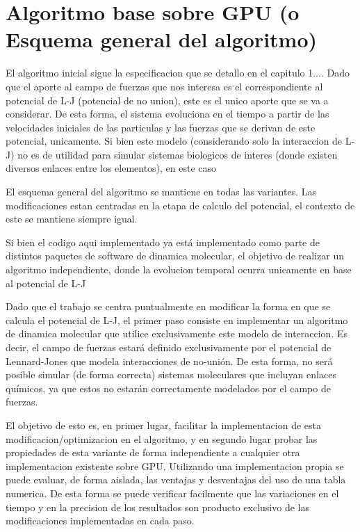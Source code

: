 \documentclass[a4paper,10pt]{report}
\begin{document}
\section{Algoritmo base sobre GPU (o Esquema general del algoritmo)}




El algoritmo inicial sigue la especificacion que se detallo en el capitulo 1....
Dado que el aporte al campo de fuerzas que nos interesa es el correspondiente al potencial de L-J (potencial de no union), este es el unico aporte que se va a considerar. De esta forma, el sistema evoluciona en el tiempo a partir de las velocidades iniciales de las particulas y las fuerzas que se derivan de este potencial, unicamente. Si bien este modelo (considerando solo la interaccion de L-J) no es de utilidad para simular sistemas biologicos de interes (donde existen diversos enlaces entre los elementos), en este caso 


El esquema general del algoritmo se mantiene en todas las variantes. Las modificaciones estan centradas en la etapa de calculo del potencial, el contexto de este se mantiene siempre igual.


Si bien el codigo aqui implementado ya está implementado como parte de distintos paquetes de software de dinamica molecular, el objetivo de realizar un algoritmo independiente, donde la evolucion temporal ocurra unicamente en base al potencial de L-J 

Dado que el trabajo se centra puntualmente en modificar la forma en que se calcula el potencial de L-J, el primer paso consiste en implementar un algoritmo de dinamica molecular que utilice exclusivamente este modelo de interaccion. 
Es decir, el campo de fuerzas estará definido exclusivamente por el potencial de Lennard-Jones que modela interacciones de no-unión. 
De esta forma, no será posible simular (de forma correcta) sistemas moleculares que incluyan enlaces químicos, ya que estos no estarán correctamente modelados por el campo de fuerzas. 

El objetivo de esto es, en primer lugar, facilitar la implementacion de esta modificacion/optimizacion en el algoritmo, y en segundo lugar probar las propiedades de esta variante de forma independiente a cualquier otra implementacion existente sobre GPU. 
Utilizando una implementacion propia se puede evaluar, de forma aislada, las ventajas y desventajas del uso de una tabla numerica. De esta forma se puede verificar facilmente que las variaciones en el tiempo y en la precision de los resultados son producto exclusivo de las modificaciones implementadas en cada paso.
\end{document}
